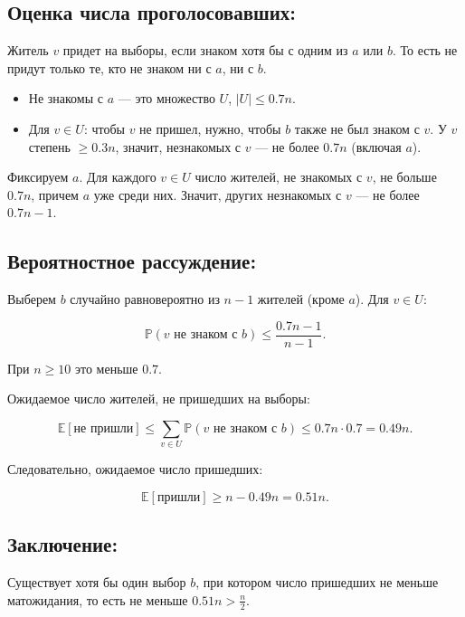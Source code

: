 \documentclass[12pt]{article}
\begin{document}
\subsection*{Оценка числа проголосовавших:}

Житель \( v \) придет на выборы, если знаком хотя бы с одним из \( a \) или \( b \).  
То есть не придут только те, кто не знаком ни с \( a \), ни с \( b \).

\begin{itemize}
    \item Не знакомы с \( a \) — это множество \( U \), \( |U| \leq 0.7n \).
    \item Для \( v \in U \): чтобы \( v \) не пришел, нужно, чтобы \( b \) также не был знаком с \( v \).  
    У \( v \) степень \( \geq 0.3n \), значит, незнакомых с \( v \) — не более \( 0.7n \) (включая \( a \)).
\end{itemize}

Фиксируем \( a \). Для каждого \( v \in U \) число жителей, не знакомых с \( v \), не больше \( 0.7n \), причем \( a \) уже среди них.  
Значит, других незнакомых с \( v \) — не более \( 0.7n - 1 \).

\subsection*{Вероятностное рассуждение:}

Выберем \( b \) случайно равновероятно из \( n-1 \) жителей (кроме \( a \)).  
Для \( v \in U \):

\[
\mathbb{P}(v \text{ не знаком с } b) \leq \frac{0.7n - 1}{n-1}.
\]

При \( n \geq 10 \) это меньше \( 0.7 \).

Ожидаемое число жителей, не пришедших на выборы:

\[
\mathbb{E}[ \text{не пришли} ] \leq \sum_{v \in U} \mathbb{P}(v \text{ не знаком с } b) \leq 0.7n \cdot 0.7 = 0.49n.
\]

Следовательно, ожидаемое число пришедших:

\[
\mathbb{E}[ \text{пришли} ] \geq n - 0.49n = 0.51n.
\]

\subsection*{Заключение:}

Существует хотя бы один выбор \( b \), при котором число пришедших не меньше матожидания, то есть не меньше \( 0.51n > \frac{n}{2} \).
\end{document}

